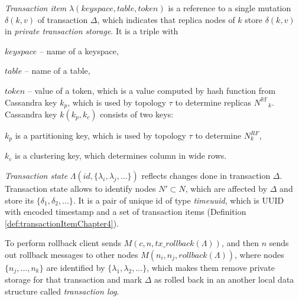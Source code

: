 \documentclass[runningheads,a4paper]{llncs}
\newcommand{\transaction}{$\Delta$\xspace}
\newcommand{\txRollbackMessage}{$\mathit{M}(c,n,\mathit{tx\_rollback}(\Lambda))$\xspace}
\newcommand{\rollbackMessage}{$\mathit{M}(n_{i}, n_{j}, \mathit{rollback}(\Lambda))$\xspace}
\newcommand{\NRF}{\mathit{N^{\mathbb{RF}}}}
\newcommand{\mutation}[2]{$\delta(#1, #2)$\xspace}
\newcommand{\mutations}{$\{\delta_{1}, \delta_{2}, ...\}$\xspace}
\newcommand{\topology}{$\tau$\xspace}
\newcommand{\txItems}{$\{\lambda_{1}, \lambda_{2}, ...\}$\xspace}
\newcommand{\client}{$c$\xspace}
\begin{document}
\begin{definition}
  \label{def:transactionItemChapter4}
  \emph{Transaction item} $\lambda(\mathit{keyspace}, \mathit{table}, \mathit{token})$ 
  is a reference to a single mutation \mutation{k}{v} of transaction \transaction, which indicates that replica nodes of $k$ store \mutation{k}{v} in \emph{private transaction storage}.  
  It is a triple with \begin{enumerate*}[label=\alph*)]
    \item $\mathit{keyspace}$ -- name of a keyspace,
    \item $\mathit{table}$ -- name of a table,
    \item $\mathit{token}$ -- value of a token, which is a value computed by hash function from Cassandra key $k_p$, which is used by topology \topology to determine replicas $\NRF_k$. Cassandra key $k(k_p,k_c)$ consists of two keys: \begin{enumerate*}[label=\alph*)]
    \item $k_p$ is a partitioning key, which is used by topology \topology to determine $\mathit{N}^{RF}_k$,
    \item $k_c$ is a clustering key, which determines column in wide rows.
  \end{enumerate*}
  \end{enumerate*}
\end{definition}

\begin{definition}
  \label{def:transactionStateChapter4}
  \emph{Transaction state} $\Lambda(\mathit{id}, \{\lambda_{i}, \lambda_{j}, ...\})$ reflects changes done in transaction \transaction. Transaction state allows to identify nodes $N' \subset N$, which are affected by \transaction and store its \mutations. It is a pair of unique id of type \emph{timeuuid}, which is UUID with encoded timestamp \cite{CassandraUUID} and a set of transaction items (Definition \ref{def:transactionItemChapter4}).
\end{definition}

To perform rollback client sends \txRollbackMessage, and then $n$ sends out rollback messages to other nodes \rollbackMessage, where nodes $\{n_j,...,n_k\}$ are identified by \txItems, which makes them remove private storage for that transaction and mark \transaction as rolled back in an another local data structure called \emph{transaction log}.
\end{document}
